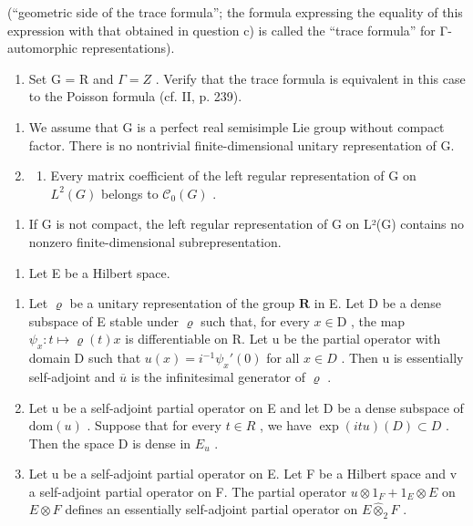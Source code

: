 (“geometric side of the trace formula”; the formula expressing the equality of this expression with that obtained in question c) is called the “trace formula” for Γ-automorphic representations).

\begin{enumerate}
\def\labelenumi{\alph{enumi})}
\setcounter{enumi}{7}
\tightlist
\item
  Set G = R and \(\Gamma = Z\) . Verify that the trace formula is equivalent in this case to the Poisson formula (cf. II, p. 239).
\end{enumerate}

\begin{enumerate}
\def\labelenumi{\arabic{enumi})}
\setcounter{enumi}{8}
\item
  We assume that G is a perfect real semisimple Lie group without compact factor. There is no nontrivial finite-dimensional unitary representation of G.
\item
  \begin{enumerate}
  \def\labelenumii{\alph{enumii})}
  \tightlist
  \item
    Every matrix coefficient of the left regular representation of G on \(L^{2}(G)\) belongs to \(\mathcal{C}_{0}(G)\) .
  \end{enumerate}
\end{enumerate}

\begin{enumerate}
\def\labelenumi{\alph{enumi})}
\setcounter{enumi}{1}
\tightlist
\item
  If G is not compact, the left regular representation of G on L²(G) contains no nonzero finite-dimensional subrepresentation.
\end{enumerate}

\begin{enumerate}
\def\labelenumi{\arabic{enumi})}
\setcounter{enumi}{10}
\tightlist
\item
  Let E be a Hilbert space.
\end{enumerate}

\begin{enumerate}
\def\labelenumi{\alph{enumi})}
\item
  Let \(\varrho\) be a unitary representation of the group \(\mathbf{R}\) in E. Let D be a dense subspace of E stable under \(\varrho\) such that, for every \(x\in\mathrm{D}\) , the map \(\psi_{x}:t\mapsto\varrho(t)x\) is differentiable on R. Let u be the partial operator with domain D such that \(u(x) = i^{-1}\psi_x'(0)\) for all \(x \in D\) . Then u is essentially self-adjoint and \(\overline{u}\) is the infinitesimal generator of \(\varrho\) .
\item
  Let u be a self-adjoint partial operator on E and let D be a dense subspace of \(\text{dom}(u)\) . Suppose that for every \(t \in R\) , we have \(\exp(itu)(D) \subset D\) . Then the space D is dense in \(E_{u}\) .
\item
  Let u be a self-adjoint partial operator on E. Let F be a Hilbert space and v a self-adjoint partial operator on F. The partial operator \(u \otimes 1_{F} + 1_{E} \otimes E\) on \(E \otimes F\) defines an essentially self-adjoint partial operator on \(E \widehat{\otimes}_{2} F\) .
\end{enumerate}

